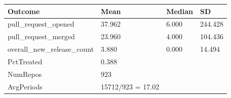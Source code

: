 
\begin{tabular}{llll}
\toprule
Outcome & Mean & Median & SD\\
\midrule
pull\_request\_opened & 37.962 & 6.000 & 244.428\\
pull\_request\_merged & 23.960 & 4.000 & 104.436\\
overall\_new\_release\_count & 3.880 & 0.000 & 14.494\\
\midrule
PctTreated & 0.388 &  &  \\
NumRepos & 923 &  &  \\
AvgPeriods & 15712/923 = 17.02 &  &  \\
\bottomrule
\end{tabular}
